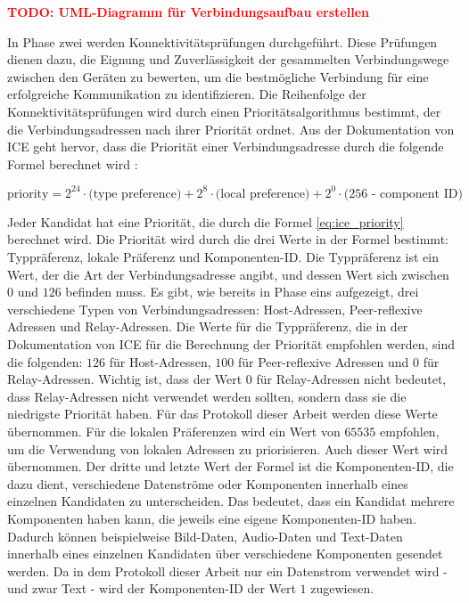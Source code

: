 \textbf{\textcolor{red}{TODO: UML-Diagramm für Verbindungsaufbau erstellen}}


\noindent In Phase zwei werden Konnektivitätsprüfungen durchgeführt. Diese Prüfungen dienen dazu, die Eignung und Zuverlässigkeit der gesammelten Verbindungswege zwischen den Geräten zu bewerten, um die bestmögliche Verbindung für eine erfolgreiche Kommunikation zu identifizieren. Die Reihenfolge der Konnektivitätsprüfungen wird durch einen Prioritätsalgorithmus bestimmt, der die Verbindungsadressen nach ihrer Priorität ordnet. Aus der Dokumentation von ICE geht hervor, dass die Priorität einer Verbindungsadresse durch die folgende Formel berechnet wird \parencite[S. 22]{rfc8445_ICE}:

\begin{equation}
    \label{eq:ice_priority}
    \text{priority} = \text{2}^{24} \cdot \text{(type preference)} + \text{2}^{8} \cdot \text{(local preference)} + \text{2}^{0} \cdot \text{(256 - component ID)}
\end{equation}

\noindent Jeder Kandidat hat eine Priorität, die durch die Formel \ref{eq:ice_priority} berechnet wird. Die Priorität wird durch die drei Werte in der Formel bestimmt: Typpräferenz, lokale Präferenz und Komponenten-ID. Die Typpräferenz ist ein Wert, der die Art der Verbindungsadresse angibt, und dessen Wert sich zwischen $0$ und $126$ befinden muss.
Es gibt, wie bereits in Phase eins aufgezeigt, drei verschiedene Typen von Verbindungsadressen: Host-Adressen, Peer-reflexive Adressen und Relay-Adressen.
Die Werte für die Typpräferenz, die in der Dokumentation von ICE für die Berechnung der Priorität empfohlen werden, sind die folgenden: $126$ für Host-Adressen, $100$ für Peer-reflexive Adressen und $0$ für Relay-Adressen. Wichtig ist, dass der Wert $0$ für Relay-Adressen nicht bedeutet, dass Relay-Adressen nicht verwendet werden sollten, sondern dass sie die niedrigste Priorität haben. Für das Protokoll dieser Arbeit werden diese Werte übernommen. Für die lokalen Präferenzen wird ein Wert von $65535$ empfohlen, um die Verwendung von lokalen Adressen zu priorisieren. Auch dieser Wert wird übernommen. Der dritte und letzte Wert der Formel ist die Komponenten-ID, die dazu dient, verschiedene Datenströme oder Komponenten innerhalb eines einzelnen Kandidaten zu unterscheiden. Das bedeutet, dass ein Kandidat mehrere Komponenten haben kann, die jeweils eine eigene Komponenten-ID haben. Dadurch können beispielweise Bild-Daten, Audio-Daten und Text-Daten innerhalb eines einzelnen Kandidaten über verschiedene Komponenten gesendet werden. Da in dem Protokoll dieser Arbeit nur ein Datenstrom verwendet wird - und zwar Text - wird der Komponenten-ID der Wert $1$ zugewiesen.

